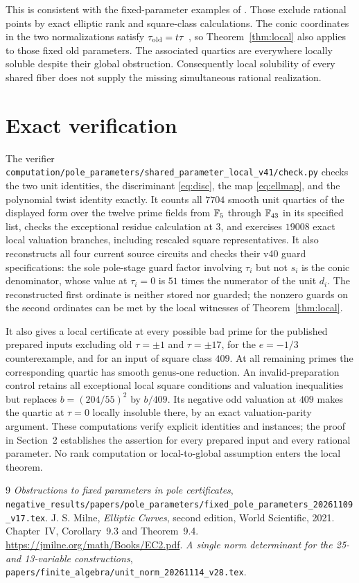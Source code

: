 \documentclass[11pt,a4paper]{article}
\theoremstyle{definition}\newtheorem{definition}[theorem]{Definition}
\begin{document}
This is consistent with the fixed-parameter examples of \cite{Fixed}.
Those exclude rational points by exact elliptic rank and square-class
calculations. The conic coordinates in the two normalizations satisfy
$\tau_{\rm old}=t\tau$ \cite[Section~4]{UnitNorm}, so
Theorem~\ref{thm:local} also applies to those fixed old parameters.
The associated quartics are everywhere locally soluble despite their
global obstruction. Consequently local solubility of every shared fiber
does not supply the missing simultaneous rational realization.

\section{Exact verification}

The verifier
\nolinkurl{computation/pole_parameters/shared_parameter_local_v41/check.py}
checks the two unit identities, the discriminant \eqref{eq:disc}, the map
\eqref{eq:ellmap}, and the polynomial twist identity exactly. It counts
all $7704$ smooth unit quartics of the displayed form over the twelve
prime fields from $\mathbb F_5$ through $\mathbb F_{43}$ in its specified list, checks
the exceptional residue calculation at $3$, and exercises $19008$ exact
local valuation branches, including rescaled square representatives.
It also reconstructs all four current source circuits and checks their
v40 guard specifications: the sole pole-stage guard factor involving
$\tau_i$ but not $s_i$ is the conic denominator, whose value at
$\tau_i=0$ is $51$ times the numerator of the unit $d_i$.
The reconstructed first ordinate is neither stored nor guarded; the
nonzero guards on the second ordinates can be met by the local witnesses
of Theorem~\ref{thm:local}.

It also gives a local certificate at every possible bad prime for the
published prepared inputs excluding old $\tau=\pm1$ and $\tau=\pm17$,
for the $e=-1/3$ counterexample, and for an input of square class $409$.
At all remaining primes the corresponding quartic has smooth genus-one
reduction. An invalid-preparation control retains all exceptional local
square conditions and valuation inequalities but replaces $b=(204/55)^2$
by $b/409$. Its negative odd valuation at $409$ makes the quartic at
$\tau=0$ locally insoluble there, by an exact valuation-parity argument.
These computations verify explicit identities and instances;
the proof in Section~2 establishes the assertion for every prepared input
and every rational parameter. No rank computation or local-to-global
assumption enters the local theorem.

\begin{thebibliography}{9}
\emph{Obstructions to fixed parameters in pole certificates},
\nolinkurl{negative_results/papers/pole_parameters/fixed_pole_parameters_20261109_v17.tex}.
J. S. Milne, \emph{Elliptic Curves}, second edition,
World Scientific, 2021. Chapter~IV, Corollary~9.3 and Theorem~9.4.
\url{https://jmilne.org/math/Books/EC2.pdf}.
\emph{A single norm determinant for the 25- and 13-variable constructions},
\nolinkurl{papers/finite_algebra/unit_norm_20261114_v28.tex}.
\end{thebibliography}
\end{document}
